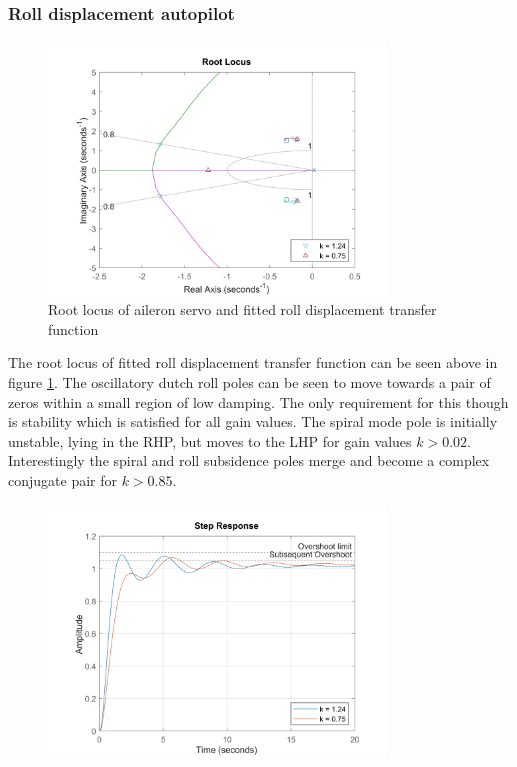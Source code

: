 \documentclass{article}
\begin{document}

\subsubsection{Roll displacement autopilot}

\begin{figure}[H]
    \centering
    \includegraphics[width=0.8\textwidth]{figures/roll_autopilot_locus_uncompensated.png}
    \caption{Root locus of aileron servo and fitted roll displacement transfer function}
    \label{fig:roll_autopilot_uncompensated_locus}
\end{figure}

The root locus of fitted roll displacement transfer function can be seen above in figure \ref{fig:roll_autopilot_uncompensated_locus}.
The oscillatory dutch roll poles can be seen to move towards a pair of zeros within a small region of low damping.
The only requirement for this though is stability which is satisfied for all gain values.
The spiral mode pole is initially unstable, lying in the RHP, but moves to the LHP for gain values $k > 0.02$.
Interestingly the spiral and roll subsidence poles merge and become a complex conjugate pair for $k > 0.85$.

\begin{figure}[H]
    \centering
    \includegraphics[width=0.8\textwidth]{figures/roll_autopilot_step_uncompensated.png}
    \caption{}
    \label{fig:roll_autopilot_step_uncompensated}
\end{figure}
\end{document}
